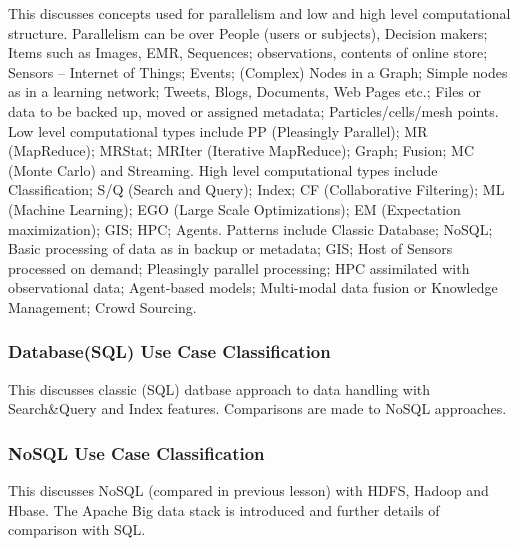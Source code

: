 This discusses concepts used for parallelism and low and high level
computational structure. Parallelism can be over People (users or
subjects), Decision makers; Items such as Images, EMR, Sequences;
observations, contents of online store; Sensors -- Internet of Things;
Events; (Complex) Nodes in a Graph; Simple nodes as in a learning
network; Tweets, Blogs, Documents, Web Pages etc.; Files or data to be
backed up, moved or assigned metadata; Particles/cells/mesh points. Low
level computational types include PP (Pleasingly Parallel); MR
(MapReduce); MRStat; MRIter (Iterative MapReduce); Graph; Fusion; MC
(Monte Carlo) and Streaming. High level computational types include
Classification; S/Q (Search and Query); Index; CF (Collaborative
Filtering); ML (Machine Learning); EGO (Large Scale Optimizations); EM
(Expectation maximization); GIS; HPC; Agents. Patterns include Classic
Database; NoSQL; Basic processing of data as in backup or metadata; GIS;
Host of Sensors processed on demand; Pleasingly parallel processing; HPC
assimilated with observational data; Agent-based models; Multi-modal
data fusion or Knowledge Management; Crowd Sourcing.





\subsubsection{Database(SQL) Use Case
Classification}\label{databasesql-use-case-classification}

This discusses classic (SQL) datbase approach to data handling with
Search\&Query and Index features. Comparisons are made to NoSQL
approaches.




\subsubsection{NoSQL Use Case
Classification}\label{nosql-use-case-classification}

This discusses NoSQL (compared in previous lesson) with HDFS, Hadoop and
Hbase. The Apache Big data stack is introduced and further details of
comparison with SQL.




